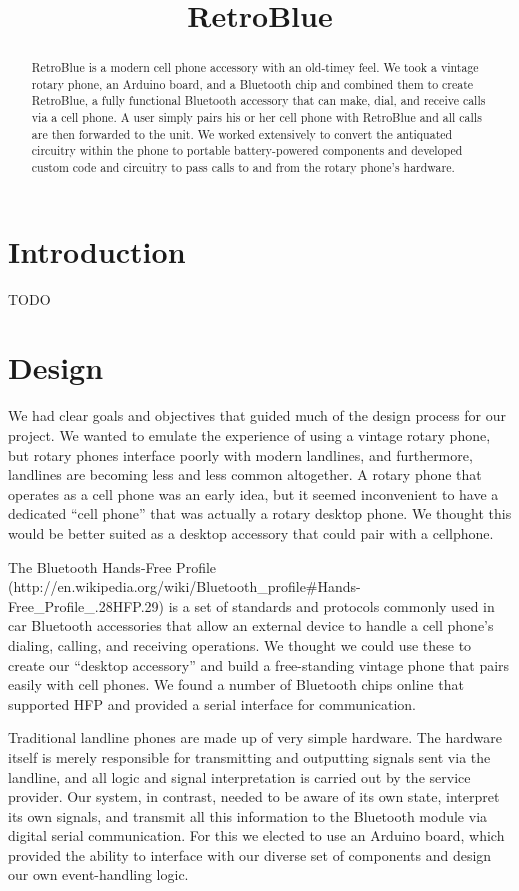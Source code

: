 \documentclass{es50report}
\title{RetroBlue}
\begin{document}
    \maketitlepage

    \begin{abstract}
        RetroBlue is a modern cell phone accessory with an old-timey feel. We took a vintage rotary phone, an Arduino board, and a Bluetooth chip and combined them to create RetroBlue, a fully functional Bluetooth accessory that can make, dial, and receive calls via a cell phone. A user simply pairs his or her cell phone with RetroBlue and all calls are then forwarded to the unit. We worked extensively to convert the antiquated circuitry within the phone to portable battery-powered components and developed custom code and circuitry to pass calls to and from the rotary phone's hardware.
    \end{abstract}
    \newpage
    \doublespacing

    \section{Introduction}
    TODO

    \section{Design}
        We had clear goals and objectives that guided much of the design process for our project. We wanted to emulate the experience of using a vintage rotary phone, but rotary phones interface poorly with modern landlines, and furthermore, landlines are becoming less and less common altogether. A rotary phone that operates as a cell phone was an early idea, but it seemed inconvenient to have a dedicated ``cell phone'' that was actually a rotary desktop phone. We thought this would be better suited as a desktop accessory that could pair with a cellphone.

        The Bluetooth Hands-Free Profile (http://en.wikipedia.org/wiki/Bluetooth\_profile#Hands-Free_Profile_.28HFP.29) is a set of standards and protocols commonly used in car Bluetooth accessories that allow an external device to handle a cell phone's dialing, calling, and receiving operations. We thought we could use these to create our ``desktop accessory'' and build a free-standing vintage phone that pairs easily with cell phones. We found a number of Bluetooth chips online that supported HFP and provided a serial interface for communication.

        Traditional landline phones are made up of very simple hardware. The hardware itself is merely responsible for transmitting and outputting signals sent via the landline, and all logic and signal interpretation is carried out by the service provider. Our system, in contrast, needed to be aware of its own state, interpret its own signals, and transmit all this information to the Bluetooth module via digital serial communication. For this we elected to use an Arduino board, which provided the ability to interface with our diverse set of components and design our own event-handling logic.
\end{document}
